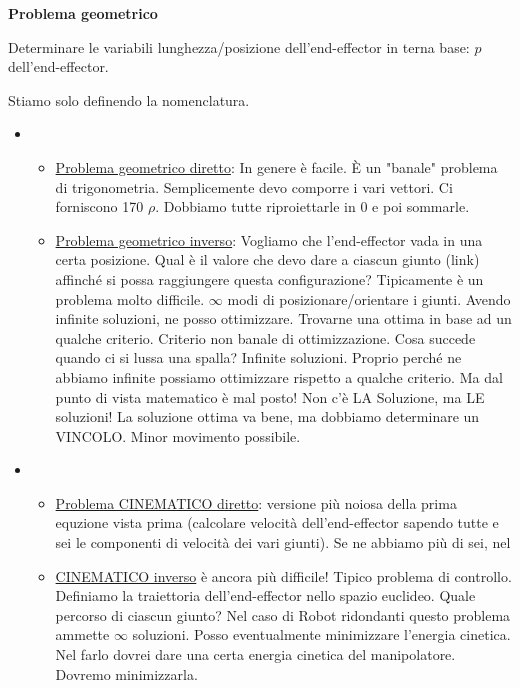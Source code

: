 \begin{defn}{\textbf{Problema geometrico}}

Determinare le variabili lunghezza/posizione dell'end-effector in terna base: $p$ dell'end-effector.

\end{defn}

Stiamo solo definendo la nomenclatura.

\begin{itemize}

\item

\begin{itemize}
\item{\underline{Problema geometrico diretto}}: In genere è facile. \`E un "banale" problema di trigonometria. Semplicemente devo comporre i vari vettori. Ci forniscono 170 $\rho$. Dobbiamo tutte riproiettarle in 0 e poi sommarle. \item{\underline{Problema geometrico inverso}}: Vogliamo che l'end-effector vada in una certa posizione. Qual è il valore che devo dare a ciascun giunto (link) affinché si possa raggiungere questa configurazione? Tipicamente è un problema molto difficile. $\infty$ modi di posizionare/orientare i giunti. Avendo infinite soluzioni, ne posso ottimizzare. Trovarne una ottima in base ad un qualche criterio. Criterio non banale di ottimizzazione. Cosa succede quando ci si lussa una spalla? Infinite soluzioni. Proprio perché ne abbiamo infinite possiamo ottimizzare rispetto a qualche criterio. Ma dal punto di vista matematico è mal posto! Non c'è LA Soluzione, ma LE soluzioni! La soluzione ottima va bene, ma dobbiamo determinare un VINCOLO. Minor movimento possibile.
\end{itemize}

\item

\begin{itemize}
\item{\underline{Problema CINEMATICO diretto}}: versione più noiosa della prima equzione vista prima (calcolare velocità dell'end-effector sapendo tutte e sei le componenti di velocità dei vari giunti). Se ne abbiamo più di sei, nel
\item{\underline{CINEMATICO inverso}} è ancora più difficile! Tipico problema di controllo. Definiamo la traiettoria dell'end-effector nello spazio euclideo. Quale percorso di ciascun giunto? Nel caso di Robot ridondanti questo problema ammette $\infty$ soluzioni. Posso eventualmente minimizzare l'energia cinetica. Nel farlo dovrei dare una certa energia cinetica del manipolatore. Dovremo minimizzarla.

\end{itemize}
\end{itemize}

